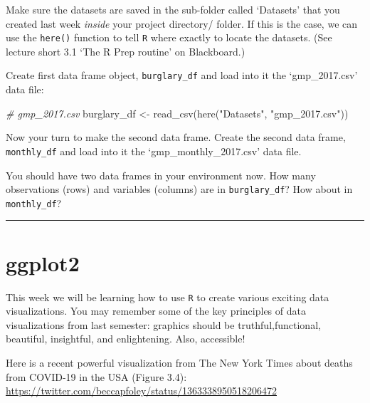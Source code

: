 \documentclass[
]{book}
\newenvironment{Shaded}{\begin{snugshade}}{\end{snugshade}}
\newcommand{\CommentTok}[1]{\textcolor[rgb]{0.56,0.35,0.01}{\textit{#1}}}
\newcommand{\FunctionTok}[1]{\textcolor[rgb]{0.00,0.00,0.00}{#1}}
\newcommand{\NormalTok}[1]{#1}
\newcommand{\OtherTok}[1]{\textcolor[rgb]{0.56,0.35,0.01}{#1}}
\newcommand{\StringTok}[1]{\textcolor[rgb]{0.31,0.60,0.02}{#1}}
\begin{document}
Make sure the datasets are saved in the sub-folder called `Datasets' that you created last week \emph{inside} your project directory/ folder. If this is the case, we can use the \texttt{here()} function to tell \texttt{R} where exactly to locate the datasets. (See lecture short 3.1 `The R Prep routine' on Blackboard.)

Create first data frame object, \texttt{burglary\_df} and load into it the `gmp\_2017.csv' data file:

\begin{Shaded}
\begin{Highlighting}[]
\CommentTok{\# gmp\_2017.csv}
\NormalTok{burglary\_df }\OtherTok{\textless{}{-}} \FunctionTok{read\_csv}\NormalTok{(}\FunctionTok{here}\NormalTok{(}\StringTok{"Datasets"}\NormalTok{, }\StringTok{"gmp\_2017.csv"}\NormalTok{))}
\end{Highlighting}
\end{Shaded}

Now your turn to make the second data frame. Create the second data frame, \texttt{monthly\_df} and load into it the `gmp\_monthly\_2017.csv' data file.

You should have two data frames in your environment now. How many observations (rows) and variables (columns) are in \texttt{burglary\_df}? How about in \texttt{monthly\_df}?

\begin{center}\rule{0.5\linewidth}{0.5pt}\end{center}

\hypertarget{ggplot2}{%
\section{ggplot2}\label{ggplot2}}

This week we will be learning how to use \texttt{R} to create various exciting data visualizations. You may remember some of the key principles of data visualizations from last semester: graphics should be truthful,functional, beautiful, insightful, and enlightening. Also, accessible!

Here is a recent powerful visualization from The New York Times about deaths from COVID-19 in the USA (Figure 3.4): \url{https://twitter.com/beccapfoley/status/1363338950518206472}
\end{document}
